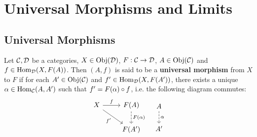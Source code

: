 \documentclass{book}
\begin{document}
	
	
	
	
	
	
	
	
	
	
	
	
	
	
	
	
	
	
	
	
	
	
	
	
	
	
	
	
	
	
	
	
	
	
	
	
	
	
	
	
	
	
	
	
	
	
	
	
	
	
	\newpage
	\chapter{Universal Morphisms and Limits}
	
	\section{Universal Morphisms}

	\begin{defn}
		Let $\mathcal{C}, \mathcal{D}$ be a categories, $X \in \operatorname{Obj}(\mathcal{D})$, $F: \mathcal{C} \rightarrow \mathcal{D}$, $A \in \operatorname{Obj}(\mathcal{C})$ and $f \in \operatorname{Hom}_{\mathcal{D}}(X, F(A))$. Then $(A, f)$ is said to be a \textbf{universal morphism} from $X$ to $F$ if for each $A' \in \operatorname{Obj}(\mathcal{C})$ and $f' \in \operatorname{Hom}_{\mathcal{D}}(X, F(A'))$, there exists a unique $\alpha \in \operatorname{Hom}_{\mathcal{C}}(A, A')$ such that $f' = F(\alpha) \circ f$, i.e. the following diagram commutes:
		\[
		\begin{tikzcd}
			X \arrow[r, "f"]  \arrow[dr, "f'"'] & F(A) \arrow[d, "F(\al)", dashed] \\
			                                    & F(A')  
		\end{tikzcd}
		\hspace{.3cm}
		\begin{tikzcd}
			A  \arrow[d, "\al", dashed] \\
			A'  
		\end{tikzcd}
		\]
	\end{defn}
\end{document}
